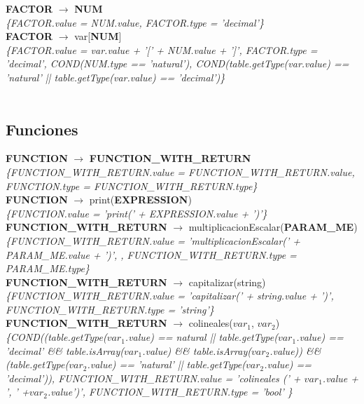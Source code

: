 \documentclass[10pt,a4paper]{article}
\begin{document}
\textbf{FACTOR} $\rightarrow$ \textbf{NUM}   \\
\textit{\{FACTOR.value = NUM.value, FACTOR.type = 'decimal'\}} \\

\textbf{FACTOR} $\rightarrow$ var[\textbf{NUM}]  \\ 
\textit{\{FACTOR.value = var.value + '[' + NUM.value + ']', FACTOR.type = 'decimal', COND(NUM.type == 'natural'), COND(table.getType(var.value) == 'natural' || table.getType(var.value) == 'decimal')\}}  \\ 
\\

\subsection{Funciones}
\textbf{FUNCTION} $\rightarrow$ \textbf{FUNCTION\_WITH\_RETURN} \\
\textit{\{FUNCTION\_WITH\_RETURN.value =  FUNCTION\_WITH\_RETURN.value, FUNCTION.type = FUNCTION\_WITH\_RETURN.type\}} \\

\textbf{FUNCTION} $\rightarrow$ print(\textbf{EXPRESSION}) \\   
\textit{\{FUNCTION.value =  'print(' + EXPRESSION.value + ')'\}} \\

\textbf{FUNCTION\_WITH\_RETURN} $\rightarrow$ multiplicacionEscalar(\textbf{PARAM\_ME}) \\ 
\textit{\{FUNCTION\_WITH\_RETURN.value =  'multiplicacionEscalar(' + PARAM\_ME.value + ')', , FUNCTION\_WITH\_RETURN.type = PARAM\_ME.type\}} \\

\textbf{FUNCTION\_WITH\_RETURN} $\rightarrow$ capitalizar(string)   \\
\textit{\{FUNCTION\_WITH\_RETURN.value =  'capitalizar(' + string.value + ')', FUNCTION\_WITH\_RETURN.type = 'string'\}} \\

\textbf{FUNCTION\_WITH\_RETURN} $\rightarrow$ colineales($var_{1}$, $var_{2}$)   \\
\textit{\{COND((table.getType($var_{1}$.value) == natural || table.getType($var_{1}$.value) == 'decimal' \&\& table.isArray($var_{1}$.value) \&\& table.isArray($var_{2}$.value)) \&\&
(table.getType($var_{2}$.value) == 'natural' || table.getType($var_{2}$.value) == 'decimal')), FUNCTION\_WITH\_RETURN.value = 'colineales (' + $var_{1}$.value + ', ' +$var_{2}$.value')', FUNCTION\_WITH\_RETURN.type = 'bool' \}} \\
\end{document}
